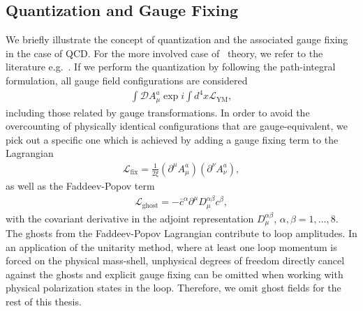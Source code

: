 \subsection{Quantization and Gauge Fixing}
\label{sec:quant-gauge-fixing}
We briefly illustrate the concept of quantization and the associated
gauge fixing in the case of QCD. For the more involved case of
\ew~theory, we refer to the literature e.g.~\cite{Bohm:2001yx}. If we
perform the quantization by following the path-integral formulation,
all gauge field configurations are considered
\begin{align}
  \int \mathcal{D}A_\mu^a\exp{i\int d^4x \mathcal{L}_{\text{YM}}},
\end{align}
including those related by gauge transformations. In order to avoid
the overcounting of physically identical configurations that are
gauge-equivalent, we pick out a specific one which is achieved by
adding a gauge fixing term to the Lagrangian
\begin{align}
  \mathcal{L}_{\text{fix}} = \frac{1}{2\xi}(\partial^\mu A_\mu^a)(\partial^\nu A_\nu^a),
\end{align}
as well as the Faddeev-Popov term
\begin{align}
  \mathcal{L}_{\text{ghost}} = -\bar{c}^\alpha\partial^\mu D_\mu^{\alpha\beta}c^{\beta},
\end{align}
with the covariant derivative in the adjoint representation
$D_\mu^{\alpha\beta}$, $\alpha,\beta=1,\ldots,8$. The ghosts from the
Faddeev-Popov Lagrangian contribute to loop amplitudes. In an
application of the unitarity method, where at least one loop momentum
is forced on the physical mass-shell, unphysical degrees of freedom directly cancel against the ghosts and explicit gauge fixing can be omitted when working with physical polarization states in the loop. Therefore, we omit ghost fields for the rest of this thesis.

